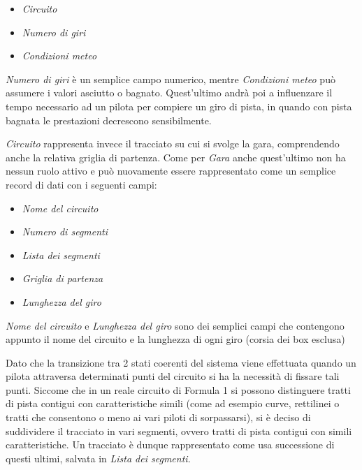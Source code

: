 \documentclass[a4paper,11pt, twoside, openright]{book}
\begin{document}
      \begin{itemize}
	\item \textsl{Circuito}
	\item \textsl{Numero di giri}
	\item \textsl{Condizioni meteo}
      \end{itemize}
      
      \textsl{Numero di giri} è un semplice campo numerico, mentre \textsl{Condizioni meteo} può assumere i 
      valori asciutto o bagnato. Quest'ultimo andrà poi a influenzare il tempo necessario ad un pilota per compiere 
      un giro di pista, in quando con pista bagnata le prestazioni decrescono sensibilmente.
      
      \textsl{Circuito} rappresenta invece il tracciato su cui si svolge la gara, comprendendo anche
      la relativa griglia di partenza.
      Come per \textsl{Gara} anche quest'ultimo non ha nessun ruolo attivo e può nuovamente
      essere rappresentato come un semplice record di dati con i seguenti campi:      
      
      \begin{itemize}
	\item \textsl{Nome del circuito}
	\item \textsl{Numero di segmenti}
	\item \textsl{Lista dei segmenti}
	\item \textsl{Griglia di partenza}
	\item \textsl{Lunghezza del giro}
      \end{itemize}
      
      \textsl{Nome del circuito} e \textsl{Lunghezza del giro} sono dei semplici campi che contengono appunto
      il nome del circuito e la lunghezza di ogni giro (corsia dei box esclusa)
      
      Dato che la transizione tra 2 stati coerenti del sistema viene effettuata quando 
      un pilota attraversa determinati punti del circuito si ha la necessità di fissare tali punti.
      Siccome che in un reale circuito 
      di Formula 1 si possono distinguere tratti di pista contigui con caratteristiche simili
      (come ad esempio curve, rettilinei o
      tratti che consentono o meno ai vari piloti di sorpassarsi), si è deciso
      di suddividere il tracciato in vari segmenti, ovvero tratti di pista contigui con simili caratteristiche.
      Un tracciato è dunque rappresentato come usa successione di questi ultimi, salvata in \textsl{Lista dei segmenti}.
      
\end{document}
